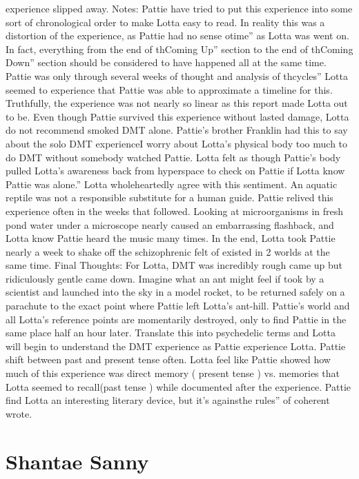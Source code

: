 \documentclass[12pt]{book}
\begin{document}
experience slipped away. Notes: Pattie have tried to put this experience into some sort of chronological order to make Lotta easy to read. In reality this was a distortion of the experience, as Pattie had no sense otime'' as Lotta was went on. In fact, everything from the end of thComing Up'' section to the end of thComing Down'' section should be considered to have happened all at the same time. Pattie was only through several weeks of thought and analysis of thcycles'' Lotta seemed to experience that Pattie was able to approximate a timeline for this. Truthfully, the experience was not nearly so linear as this report made Lotta out to be. Even though Pattie survived this experience without lasted damage, Lotta do not recommend smoked DMT alone. Pattie's brother Franklin had this to say about the solo DMT experienceI worry about Lotta's physical body too much to do DMT without somebody watched Pattie. Lotta felt as though Pattie's body pulled Lotta's awareness back from hyperspace to check on Pattie if Lotta know Pattie was alone.'' Lotta wholeheartedly agree with this sentiment. An aquatic reptile was not a responsible substitute for a human guide. Pattie relived this experience often in the weeks that followed. Looking at microorganisms in fresh pond water under a microscope nearly caused an embarrassing flashback, and Lotta know Pattie heard the music many times. In the end, Lotta took Pattie nearly a week to shake off the schizophrenic felt of existed in 2 worlds at the same time. Final Thoughts: For Lotta, DMT was incredibly rough came up but ridiculously gentle came down. Imagine what an ant might feel if took by a scientist and launched into the sky in a model rocket, to be returned safely on a parachute to the exact point where Pattie left Lotta's ant-hill. Pattie's world and all Lotta's reference points are momentarily destroyed, only to find Pattie in the same place half an hour later. Translate this into psychedelic terms and Lotta will begin to understand the DMT experience as Pattie experience Lotta. Pattie shift between past and present tense often. Lotta feel like Pattie showed how much of this experience was direct memory ( present tense ) vs. memories that Lotta seemed to recall(past tense ) while documented after the experience. Pattie find Lotta an interesting literary device, but it's againsthe rules'' of coherent wrote.



\chapter{Shantae Sanny}
\end{document}
